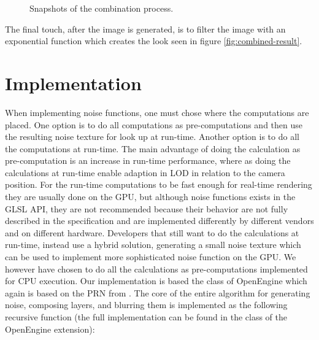 \begin{figure}[!h]
    \centering
  \hspace{4mm}
  \hspace{4mm}
  \hspace{4mm}
  \caption{Snapshots of the combination process.}
  \label{fig:combined-layers}
\end{figure}

The final touch, after the image is generated, is to filter the image
with an exponential function which creates the look seen in figure
\ref{fig:combined-result}.

\section{Implementation}
When implementing noise functions, one must chose where the
computations are placed. One option is to do all computations as
pre-computations and then use the resulting noise texture for look up
at run-time. Another option is to do all the computations at
run-time. The main advantage of doing the calculation as pre-computation
is an increase in run-time performance, where as doing the calculations
at run-time enable adaption in LOD in relation to the camera
position. For the run-time computations to be fast enough for
real-time rendering they are usually done on the GPU, but although noise
functions exists in the GLSL API\citebook{}{}, they are not recommended because
their behavior are not fully described in the specification and are
implemented differently by different vendors and on different
hardware. Developers that still want to do the calculations
at run-time, instead use a hybrid solution, generating a small noise
texture which can be used to implement more sophisticated noise
function on the GPU.
%
We however have chosen to do all the calculations as pre-computations
implemented for CPU execution. Our implementation is based the
 class of OpenEngine which again is based on the
PRN from .
%
The core of the entire algorithm for generating noise, composing
layers, and blurring them is implemented as the following recursive
function (the full implementation can be found in the 
class of the  OpenEngine extension):

